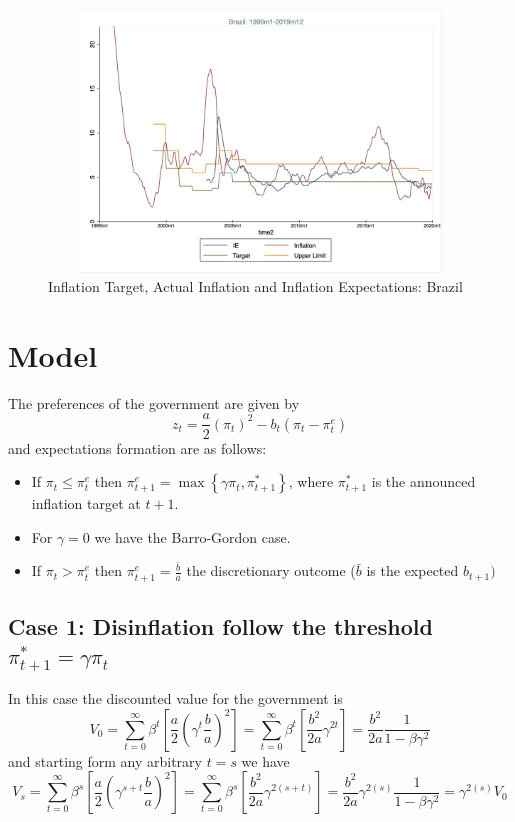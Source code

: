 \documentclass[12pt]{article}
\theoremstyle{definition}
\theoremstyle{plain}
\theoremstyle{plain}
\theoremstyle{remark}
\theoremstyle{plain}
\begin{document}
\begin{figure}[H]
\centering 
\caption{Inflation Target, Actual Inflation and Inflation Expectations: Brazil} 
\label{fig: figure3}
\includegraphics[width=12cm, height=7cm]{Brazil}
\end{figure}

\section{Model}
\justify
The preferences of the government are given by 
\[
z_{t}=\frac{a}{2}\left(\pi_{t}\right)^{2}-b_{t}(\pi_{t}-\pi_{t}^{e})
\]
\justify
and expectations formation are as follows:
\begin{itemize}
\item If $\pi_{t}\leq\pi_{t}^{e}$ then $\pi_{t+1}^{e}=\max\left\{ \gamma\pi_{t},\pi_{t+1}^{\ast}\right\} $,
where $\pi_{t+1}^{\ast}$ is the announced inflation target at $t+1$.
\item For $\gamma=0$ we have the Barro-Gordon case.
\item If $\pi_{t}>\pi_{t}^{e}$ then $\pi_{t+1}^{e}=\frac{\bar{b}}{a}$ the discretionary outcome ($\bar{b}$ is the expected $b_{t+1})$
\end{itemize}

\subsection*{Case 1: Disinflation follow the threshold $\pi_{t+1}^{\ast}=\gamma\pi_{t}$}
\justify
In this case the discounted value for the government is 
\[
V_{0}=\sum_{t=0}^{\infty}\beta^{t}\left[\frac{a}{2}\left(\gamma^{t}\frac{b}{a}\right)^{2}\right]=\sum_{t=0}^{\infty}\beta^{t}\left[\frac{b^{2}}{2a}\gamma^{2t}\right]=\frac{b^{2}}{2a}\frac{1}{1-\beta\gamma^{2}}
\]
\justify
and starting form any arbitrary $t=s$ we have 
\[
V_{s}=\sum_{t=0}^{\infty}\beta^{s}\left[\frac{a}{2}\left(\gamma^{s+t}\frac{b}{a}\right)^{2}\right]=\sum_{t=0}^{\infty}\beta^{s}\left[\frac{b^{2}}{2a}\gamma^{2(s+t)}\right]=\frac{b^{2}}{2a}\gamma^{2(s)}\frac{1}{1-\beta\gamma^{2}}=\gamma^{2(s)}V_{0}
\]
\end{document}

